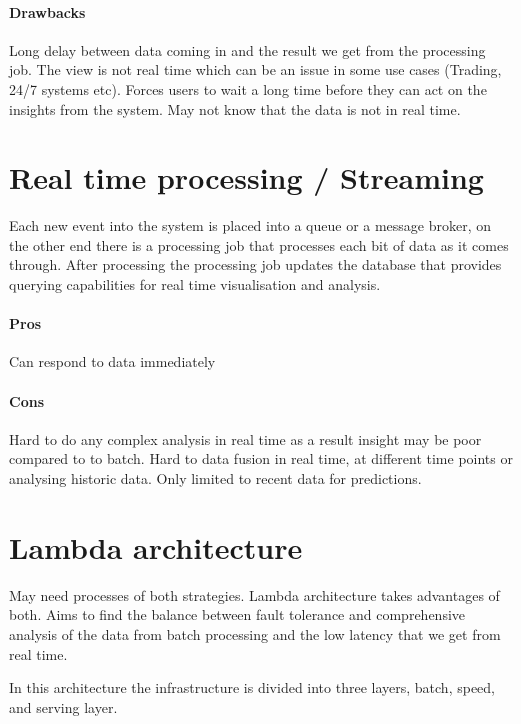 \documentclass[a4paper, 11pt]{book}
\begin{document}
    \paragraph{Drawbacks}
    Long delay between data coming in and the result we get from the processing job.
    The view is not real time which can be an issue in some use cases (Trading, 24/7 systems etc).
    Forces users to wait a long time before they can act on the insights from the system.
    May not know that the data is not in real time.


    \section{Real time processing / Streaming}
    Each new event into the system is placed into a queue or a message broker, on the other end there is a processing job that processes each bit of data as it comes through.
    After processing the processing job updates the database that provides querying capabilities for real time visualisation and analysis.

    \paragraph{Pros}
    Can respond to data immediately

    \paragraph{Cons}
    Hard to do any complex analysis in real time as a result insight may be poor compared to to batch.
    Hard to data fusion in real time, at different time points or analysing historic data. Only limited to recent data for predictions.


    \section{Lambda architecture}
    May need processes of both strategies.
    Lambda architecture takes advantages of both.
    Aims to find the balance between fault tolerance and comprehensive analysis of the data from batch processing and the low latency that we get from real time.

    In this architecture the infrastructure is divided into three layers, batch, speed, and serving layer.
\end{document}
